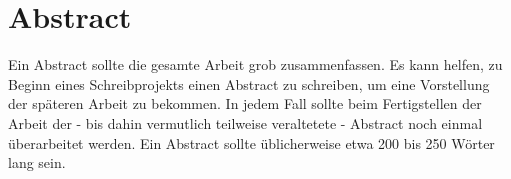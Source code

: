 \documentclass{thesisclass}
\let\cleardoublepage\clearpage
\begin{document}

\frontmatter
{}

\blankpage

\chapter*{Abstract}
Ein Abstract sollte die gesamte Arbeit grob zusammenfassen.
Es kann helfen, zu Beginn eines Schreibprojekts einen Abstract zu schreiben, um eine Vorstellung der späteren Arbeit zu bekommen.
In jedem Fall sollte beim Fertigstellen der Arbeit der - bis dahin vermutlich teilweise veraltetete - Abstract noch einmal überarbeitet werden.
Ein Abstract sollte üblicherweise etwa 200 bis 250 Wörter lang sein.

\tableofcontents
\blankpage


\mainmatter
{}




\cleardoublepage
{}
{}

{}	%
{}	%
												  


\end{document}
